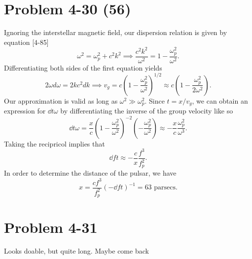 \section*{Problem 4-30 (56)}
\label{sec:4-30}
Ignoring the interstellar magnetic field, our dispersion relation is given by equation [4-85]
\begin{equation*}
	\omega^2 = \omega_p^2 + c^2k^2 \implies \dfrac{c^2k^2}{\omega^2} = 1 - \dfrac{\omega_p^2}{\omega^2}.
\end{equation*}
Differentiating both sides of the first equation yields
\begin{equation*}
	2\omega d\omega = 2kc^2dk \implies v_g = c\left(1 - \dfrac{\omega_p^2}{\omega^2}\right)^{1/2} \approx c\left(1 - \dfrac{\omega_p^2}{2\omega^2}\right).
\end{equation*}
Our approximation is valid as long as \(\omega^2 \gg \omega_p^2 \). Since \(t = x/v_g \), we can obtain an expression for \(\dd{t}{\omega} \) by differentiating the inverse of the group velocity like so
\begin{equation*}
	\dd{t}{\omega} = \dfrac{x}{c}\left(1 - \dfrac{\omega_p^2}{\omega^2}\right)^{-2}\left(-\dfrac{\omega_p^2}{\omega^2} \right) \approx -\dfrac{x}{c}\dfrac{\omega_p^2}{\omega^3}.
\end{equation*}
Taking the recipricol implies that 
\begin{equation*}
	\dd{f}{t} \approx -\dfrac{c}{x}\dfrac{f^3}{f^2_p}.
\end{equation*}
In order to determine the distance of the pulsar, we have
\begin{equation*}
	x = \dfrac{cf^3}{f^2_p}\left(-\dd{f}{t} \right)^{-1} = 63\text{ parsecs}.
\end{equation*}


\section*{Problem 4-31}
\label{sec:4-31}
Looks doable, but quite long. Maybe come back

